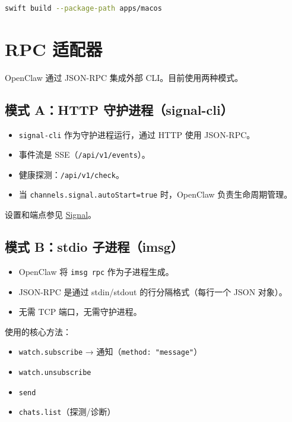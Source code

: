 \begin{lstlisting}[language=bash]
swift build --package-path apps/macos
\end{lstlisting}



\clearpage

\section{RPC 适配器}


OpenClaw 通过 JSON-RPC 集成外部 CLI。目前使用两种模式。

\subsection{模式 A：HTTP 守护进程（signal-cli）}


\begin{itemize}
  \item \texttt{signal-cli} 作为守护进程运行，通过 HTTP 使用 JSON-RPC。
  \item 事件流是 SSE（\texttt{/api/v1/events}）。
  \item 健康探测：\texttt{/api/v1/check}。
  \item 当 \texttt{channels.signal.autoStart=true} 时，OpenClaw 负责生命周期管理。
\end{itemize}


设置和端点参见 \href{/channels/signal}{Signal}。

\subsection{模式 B：stdio 子进程（imsg）}


\begin{itemize}
  \item OpenClaw 将 \texttt{imsg rpc} 作为子进程生成。
  \item JSON-RPC 是通过 stdin/stdout 的行分隔格式（每行一个 JSON 对象）。
  \item 无需 TCP 端口，无需守护进程。
\end{itemize}


使用的核心方法：

\begin{itemize}
  \item \texttt{watch.subscribe} → 通知（\texttt{method: "message"}）
  \item \texttt{watch.unsubscribe}
  \item \texttt{send}
  \item \texttt{chats.list}（探测/诊断）
\end{itemize}


